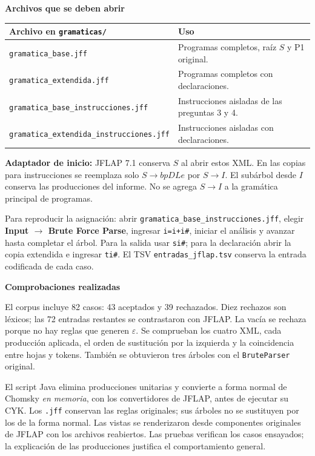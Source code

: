 \documentclass[11pt,letterpaper]{article}
\newcommand{\cod}[1]{\texttt{#1}}
\newcommand{\subtitulo}[1]{\vspace{5pt}\textbf{#1}\par\nopagebreak[4]}
\newcommand{\cab}[1]{\rowcolor{cabecera}#1}
\begin{document}
\subtitulo{Archivos que se deben abrir}
\begin{tabularx}{\textwidth}{|p{7.7cm}|X|}\hline
\cab{\textbf{Archivo en \cod{gramaticas/}}&\textbf{Uso}}\\\hline
\cod{gramatica\_base.jff}&Programas completos, raíz $S$ y P1 original.\\\hline
\cod{gramatica\_extendida.jff}&Programas completos con declaraciones.\\\hline
\cod{gramatica\_base\_instrucciones.jff}&Instrucciones aisladas de las preguntas 3 y 4.\\\hline
\cod{gramatica\_extendida\_instrucciones.jff}&Instrucciones aisladas con declaraciones.\\\hline
\end{tabularx}
\textbf{Adaptador de inicio:} JFLAP 7.1 conserva $S$ al abrir estos XML. En las copias para instrucciones se reemplaza solo $S\to bpDLe$ por $S\to I$. El subárbol desde $I$ conserva las producciones del informe. No se agrega $S\to I$ a la gramática principal de programas.

Para reproducir la asignación: abrir \cod{gramatica\_base\_instrucciones.jff}, elegir \textbf{Input $\to$ Brute Force Parse}, ingresar \cod{i=i+i\#}, iniciar el análisis y avanzar hasta completar el árbol. Para la salida usar \cod{si\#}; para la declaración abrir la copia extendida e ingresar \cod{ti\#}. El TSV \cod{entradas\_jflap.tsv} conserva la entrada codificada de cada caso.

\subtitulo{Comprobaciones realizadas}
El corpus incluye 82 casos: 43 aceptados y 39 rechazados. Diez rechazos son léxicos; las 72 entradas restantes se contrastaron con JFLAP. La vacía se rechaza porque no hay reglas que generen $\varepsilon$. Se comprueban los cuatro XML, cada producción aplicada, el orden de sustitución por la izquierda y la coincidencia entre hojas y tokens. También se obtuvieron tres árboles con el \cod{BruteParser} original.

El script Java elimina producciones unitarias y convierte a forma normal de Chomsky \emph{en memoria}, con los convertidores de JFLAP, antes de ejecutar su CYK. Los \cod{.jff} conservan las reglas originales; sus árboles no se sustituyen por los de la forma normal. Las vistas se renderizaron desde componentes originales de JFLAP con los archivos reabiertos. Las pruebas verifican los casos ensayados; la explicación de las producciones justifica el comportamiento general.

\clearpage
\end{document}
